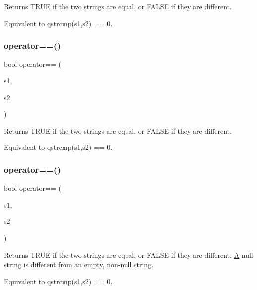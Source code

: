 Returns T\+R\+UE if the two strings are equal, or F\+A\+L\+SE if they are different.

Equivalent to {\ttfamily qstrcmp(s1,s2) == 0}. \mbox{\label{class_q_string_af35a5ca71a731a8ecf66c62a74123be2}} 
\subsubsection{\texorpdfstring{operator==()}{operator==()}\hspace{0.1cm}{\footnotesize\ttfamily [2/3]}}
{\footnotesize\ttfamily bool operator== (\begin{DoxyParamCaption}\item[{const \mbox{\hyperlink{class_q_string}{Q\+String}} \&}]{s1,  }\item[{const char $\ast$}]{s2 }\end{DoxyParamCaption})\hspace{0.3cm}{\ttfamily [related]}}

Returns T\+R\+UE if the two strings are equal, or F\+A\+L\+SE if they are different.

Equivalent to {\ttfamily qstrcmp(s1,s2) == 0}. \mbox{\label{class_q_string_acdeb7d77a324fe69b0e5889ff8575400}} 
\subsubsection{\texorpdfstring{operator==()}{operator==()}\hspace{0.1cm}{\footnotesize\ttfamily [3/3]}}
{\footnotesize\ttfamily bool operator== (\begin{DoxyParamCaption}\item[{const \mbox{\hyperlink{class_q_string}{Q\+String}} \&}]{s1,  }\item[{const \mbox{\hyperlink{class_q_string}{Q\+String}} \&}]{s2 }\end{DoxyParamCaption})\hspace{0.3cm}{\ttfamily [related]}}

Returns T\+R\+UE if the two strings are equal, or F\+A\+L\+SE if they are different. \mbox{\hyperlink{class_a}{A}} null string is different from an empty, non-\/null string.

Equivalent to {\ttfamily qstrcmp(s1,s2) == 0}. \mbox{\label{class_q_string_a382b1ef4a8de8768259b825b534fcda1}} 
